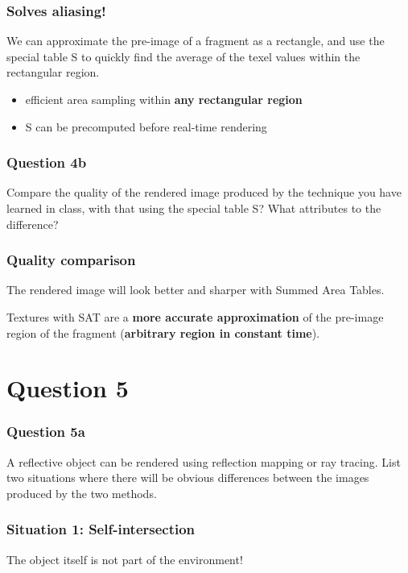 \documentclass{beamer}
\begin{document}
\begin{frame}
    \frametitle{Solves \textbf{aliasing}!}

    We can approximate the pre-image of a fragment as a rectangle, 
    and use the special table S to quickly find the average of the
    texel values within the rectangular region. 
    
    \begin{itemize}
        \item efficient area sampling within \textbf{any rectangular region}
        \item S can be precomputed before real-time rendering
    \end{itemize}

\end{frame}

\begin{frame}
    \frametitle{Question 4b}

    Compare the quality of the rendered image produced by the technique you have learned in class, 
    with that using the special table S?  What attributes to the difference?

\end{frame}

\begin{frame}
    \frametitle{Quality comparison}

    \begin{tcolorbox}
        The rendered image will look better and sharper with Summed Area Tables.
    \end{tcolorbox}
    Textures with SAT are a \textbf{more accurate approximation} of the pre-image
    region of the fragment (\textbf{arbitrary region in constant time}).

\end{frame}

\section{Question 5}

\begin{frame}
    \frametitle{Question 5a}

    A reflective object can be rendered using reflection mapping or ray tracing. List two situations 
    where there will be obvious differences between the images produced by the two methods.
\end{frame}

\begin{frame}
    \frametitle{Situation 1: Self-intersection}

    The object itself is not part of the environment!

\end{frame}
\end{document}
